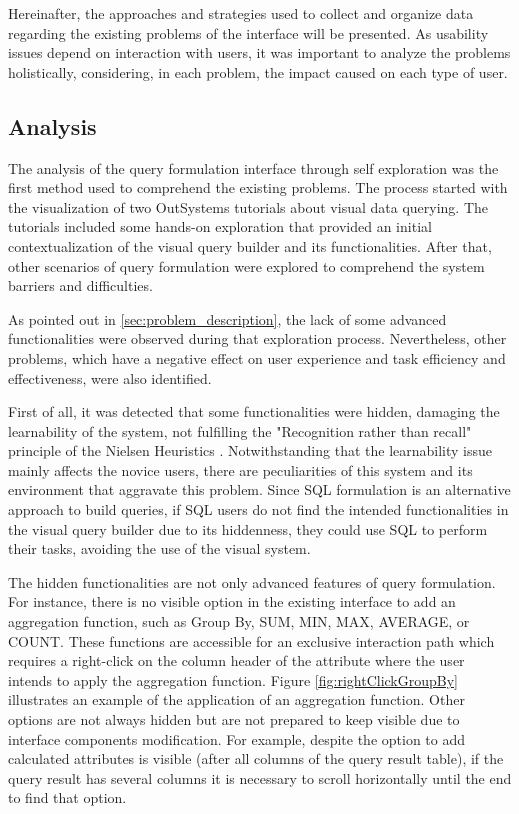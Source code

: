 Hereinafter, the approaches and strategies used to collect and organize data regarding the existing problems of the interface will be presented. As usability issues depend on interaction with users, it was important to analyze the problems holistically, considering, in each problem, the impact caused on each type of user.

\subsection{Analysis}
\label{subsec:analysis}

The analysis of the query formulation interface through self exploration was the first method used to comprehend the existing problems. The process started with the visualization of two OutSystems tutorials \cite{outsystems_tutorial_aggregates_101, outsystems_tutorial_advanced_aggregates} about visual data querying. The tutorials included some hands-on exploration that provided an initial contextualization of the visual query builder and its functionalities. After that, other scenarios of query formulation were explored to comprehend the system barriers and difficulties.

As pointed out in \ref{sec:problem_description}, the lack of some advanced functionalities were observed during that exploration process. Nevertheless, other problems, which have a negative effect on user experience and task efficiency and effectiveness, were also identified.

First of all, it was detected that some functionalities were hidden, damaging the learnability of the system, not fulfilling the "Recognition rather than recall" principle of the Nielsen Heuristics \cite{nielsen_heuristics}. Notwithstanding that the learnability issue mainly affects the novice users, there are peculiarities of this system and its environment that aggravate this problem. Since SQL formulation is an alternative approach to build queries, if SQL users do not find the intended functionalities in the visual query builder due to its hiddenness, they could use SQL to perform their tasks, avoiding the use of the visual system.

The hidden functionalities are not only advanced features of query formulation. For instance, there is no visible option in the existing interface to add an aggregation function, such as Group By, SUM, MIN, MAX, AVERAGE, or COUNT. These functions are accessible for an exclusive interaction path which requires a right-click on the column header of the attribute where the user intends to apply the aggregation function. Figure \ref{fig:rightClickGroupBy} illustrates an example of the application of an aggregation function. Other options are not always hidden but are not prepared to keep visible due to interface components modification. For example, despite the option to add calculated attributes is visible (after all columns of the query result table), if the query result has several columns it is necessary to scroll horizontally until the end to find that option.


